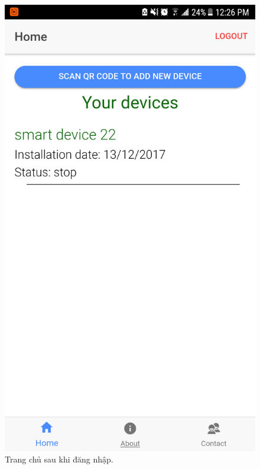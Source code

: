 \documentclass[a4paper,12pt,oneside]{article}
\begin{document}
\begin{figure}[H]
\begin{center}
\includegraphics[scale=.25]{hinh/mobile_home.png}
\end{center}
\caption{Trang chủ sau khi đăng nhập.}
\end{figure}
\end{document}
